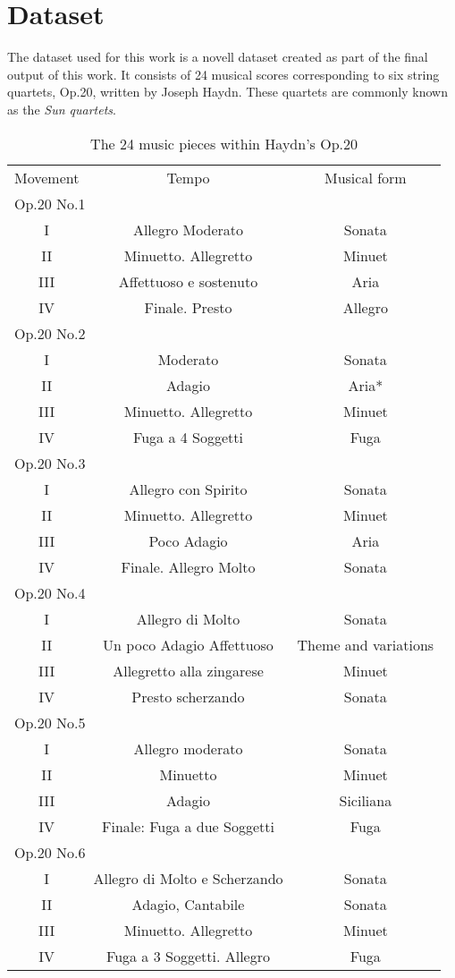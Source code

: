 \chapter{Dataset}
\label{chap:dataset}
The dataset used for this work is a novell dataset created as part of the final output of this work. It consists of 24 musical scores corresponding to six string quartets, Op.20, written by Joseph Haydn. These quartets are commonly known as the \emph{Sun quartets}.

\begin{table}[]
\centering
\begin{tabular}{ccc}
Movement & Tempo & Musical form \\
\multicolumn{3}{l}{Op.20 No.1} \\
I & Allegro Moderato & Sonata \\
II & Minuetto. Allegretto & Minuet \\
III & Affettuoso e sostenuto & Aria \\
IV & Finale. Presto & Allegro \\
\multicolumn{3}{l}{Op.20 No.2} \\
I & Moderato & Sonata \\
II & Adagio & Aria* \\
III & Minuetto. Allegretto & Minuet \\
IV & Fuga a 4 Soggetti & Fuga \\
\multicolumn{3}{l}{Op.20 No.3} \\
I & Allegro con Spirito & Sonata \\
II & Minuetto. Allegretto & Minuet \\
III & Poco Adagio & Aria \\
IV & Finale. Allegro Molto & Sonata \\
\multicolumn{3}{l}{Op.20 No.4} \\
I & Allegro di Molto & Sonata \\
II & Un poco Adagio Affettuoso & Theme and variations \\
III & Allegretto alla zingarese & Minuet \\
IV & Presto scherzando & Sonata \\
\multicolumn{3}{l}{Op.20 No.5} \\
I & Allegro moderato & Sonata \\
II & Minuetto & Minuet \\
III & Adagio & Siciliana \\
IV & Finale: Fuga a due Soggetti & Fuga \\
\multicolumn{3}{l}{Op.20 No.6} \\
I & Allegro di Molto e Scherzando & Sonata \\
II & Adagio, Cantabile & Sonata \\
III & Minuetto. Allegretto & Minuet \\
IV & Fuga a 3 Soggetti. Allegro & Fuga
\end{tabular}
\caption{The 24 music pieces within Haydn's Op.20}
\label{table:op20}
\end{table}


